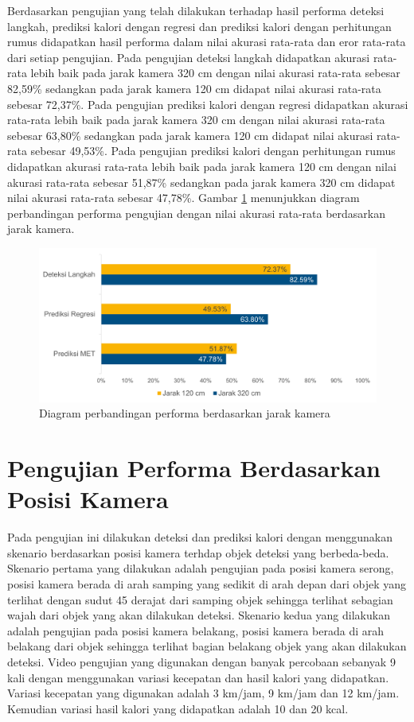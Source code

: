 Berdasarkan pengujian yang telah dilakukan terhadap hasil performa deteksi langkah, prediksi kalori dengan regresi dan prediksi kalori dengan perhitungan rumus didapatkan hasil performa dalam nilai akurasi rata-rata dan eror rata-rata dari setiap pengujian. Pada pengujian deteksi langkah didapatkan akurasi rata-rata lebih baik pada jarak kamera 320 cm dengan nilai akurasi rata-rata sebesar 82,59\% sedangkan pada jarak kamera 120 cm didapat nilai akurasi rata-rata sebesar 72,37\%. Pada pengujian prediksi kalori dengan regresi didapatkan akurasi rata-rata lebih baik pada jarak kamera 320 cm dengan nilai akurasi rata-rata sebesar 63,80\% sedangkan pada jarak kamera 120 cm didapat nilai akurasi rata-rata sebesar 49,53\%. Pada pengujian prediksi kalori dengan perhitungan rumus didapatkan akurasi rata-rata lebih baik pada jarak kamera 120 cm dengan nilai akurasi rata-rata sebesar 51,87\% sedangkan pada jarak kamera 320 cm didapat nilai akurasi rata-rata sebesar 47,78\%. Gambar \ref{fig:DiagramJarak} menunjukkan diagram perbandingan performa pengujian dengan nilai akurasi rata-rata berdasarkan jarak kamera.

\begin{figure}[H]
  \centering
  \includegraphics[scale=0.7]{gambar/diagram_jarak.png}
  \caption{Diagram perbandingan performa berdasarkan jarak kamera}
  \label{fig:DiagramJarak}
\end{figure}

\section{Pengujian Performa Berdasarkan Posisi Kamera}
\label{sec:PengujianPosisi}

Pada pengujian ini dilakukan deteksi dan prediksi kalori dengan menggunakan skenario berdasarkan posisi kamera terhdap objek deteksi yang berbeda-beda. Skenario pertama yang dilakukan adalah pengujian pada posisi kamera serong, posisi kamera berada di arah samping yang sedikit di arah depan dari objek yang terlihat dengan sudut 45 derajat dari samping objek sehingga terlihat sebagian wajah dari objek yang akan dilakukan deteksi. Skenario kedua yang dilakukan adalah pengujian pada posisi kamera belakang, posisi kamera berada di arah belakang dari objek sehingga terlihat bagian belakang objek yang akan dilakukan deteksi. Video pengujian yang digunakan dengan banyak percobaan sebanyak 9 kali dengan menggunakan variasi kecepatan dan hasil kalori yang didapatkan. Variasi kecepatan yang digunakan adalah 3 km/jam, 9 km/jam dan 12 km/jam. Kemudian variasi hasil kalori yang didapatkan adalah 10 dan 20 kcal. 


